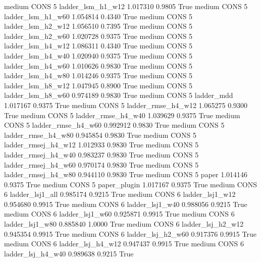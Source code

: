     medium     CONS                 5   ladder_lsm_h1_w12   1.017310      0.9805    True
    medium     CONS                 5   ladder_lsm_h1_w60   1.054814      0.4340    True
    medium     CONS                 5   ladder_lsm_h2_w12   1.056510      0.7395    True
    medium     CONS                 5   ladder_lsm_h2_w60   1.020728      0.9375    True
    medium     CONS                 5   ladder_lsm_h4_w12   1.086311      0.4340    True
    medium     CONS                 5   ladder_lsm_h4_w40   1.020940      0.9375    True
    medium     CONS                 5   ladder_lsm_h4_w60   1.010626      0.9830    True
    medium     CONS                 5   ladder_lsm_h4_w80   1.014246      0.9375    True
    medium     CONS                 5   ladder_lsm_h8_w12   1.047945      0.8900    True
    medium     CONS                 5   ladder_lsm_h8_w60   0.974189      0.9830    True
    medium     CONS                 5          ladder_mdd   1.017167      0.9375    True
    medium     CONS                 5  ladder_rmse_h4_w12   1.065275      0.9300    True
    medium     CONS                 5  ladder_rmse_h4_w40   1.039629      0.9375    True
    medium     CONS                 5  ladder_rmse_h4_w60   0.992912      0.9830    True
    medium     CONS                 5  ladder_rmse_h4_w80   0.945854      0.9830    True
    medium     CONS                 5 ladder_rmsej_h4_w12   1.012933      0.9830    True
    medium     CONS                 5 ladder_rmsej_h4_w40   0.983237      0.9830    True
    medium     CONS                 5 ladder_rmsej_h4_w60   0.970174      0.9830    True
    medium     CONS                 5 ladder_rmsej_h4_w80   0.944110      0.9830    True
    medium     CONS                 5               paper   1.014146      0.9375    True
    medium     CONS                 5        paper_plugin   1.017167      0.9375    True
    medium     CONS                 6     ladder_lsj1_all   0.985174      0.9215    True
    medium     CONS                 6     ladder_lsj1_w12   0.954680      0.9915    True
    medium     CONS                 6     ladder_lsj1_w40   0.988056      0.9215    True
    medium     CONS                 6     ladder_lsj1_w60   0.925871      0.9915    True
    medium     CONS                 6     ladder_lsj1_w80   0.885840      1.0000    True
    medium     CONS                 6   ladder_lsj_h2_w12   0.945354      0.9915    True
    medium     CONS                 6   ladder_lsj_h2_w60   0.917376      0.9915    True
    medium     CONS                 6   ladder_lsj_h4_w12   0.947437      0.9915    True
    medium     CONS                 6   ladder_lsj_h4_w40   0.989638      0.9215    True
